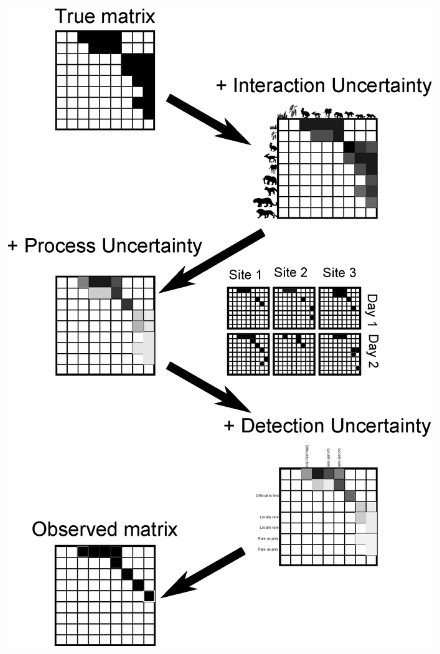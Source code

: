\documentclass[12pt]{article}
\begin{document}
\begin{figure}[h!]
\begin{center}
    \includegraphics*[height=.6\textheight]{figures/conceptual_fig.eps}
    \end{center}
    \end{figure}
\end{document}

